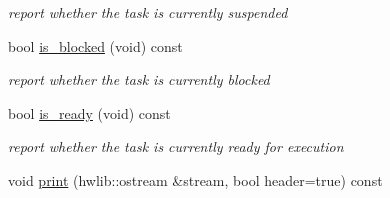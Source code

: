 \begin{DoxyCompactItemize}
\begin{DoxyCompactList}\small\item\em report whether the task is currently suspended \end{DoxyCompactList}\item 
bool \hyperlink{classrtos_1_1task__base_a239db2650c0258d52c73bfa386455476}{is\+\_\+blocked} (void) const \hypertarget{classrtos_1_1task__base_a239db2650c0258d52c73bfa386455476}{}\label{classrtos_1_1task__base_a239db2650c0258d52c73bfa386455476}

\begin{DoxyCompactList}\small\item\em report whether the task is currently blocked \end{DoxyCompactList}\item 
bool \hyperlink{classrtos_1_1task__base_a2da0d689fd9d9546483a83e8787d0ad8}{is\+\_\+ready} (void) const \hypertarget{classrtos_1_1task__base_a2da0d689fd9d9546483a83e8787d0ad8}{}\label{classrtos_1_1task__base_a2da0d689fd9d9546483a83e8787d0ad8}

\begin{DoxyCompactList}\small\item\em report whether the task is currently ready for execution \end{DoxyCompactList}\item 
void \hyperlink{classrtos_1_1task__base_a0b79c3c2b76ce32284638467cec95c65}{print} (hwlib\+::ostream \&stream, bool header=true) const \hypertarget{classrtos_1_1task__base_a0b79c3c2b76ce32284638467cec95c65}{}\label{classrtos_1_1task__base_a0b79c3c2b76ce32284638467cec95c65}


\end{DoxyCompactItemize}
